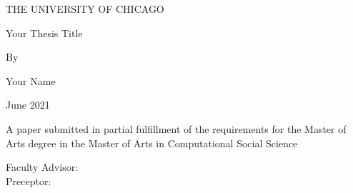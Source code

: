 \documentclass[letterpaper,12pt]{article}
\begin{document}
\begin{titlepage}

\begin{center}
\LARGE{THE UNIVERSITY OF CHICAGO}

\vspace{1in}

\LARGE{Your Thesis Title}

\vspace{1in}
    
\Large{By}

\vspace{0.5in}

\Large{Your Name}

\vspace{0.5in}

\Large{June 2021} %
    
\vfill
    
\Large{A paper submitted in partial fulfillment of the requirements for the Master of Arts degree in the Master of Arts in Computational Social Science}
    
\vspace{0.5in}
    
\begin{flushleft}
\Large{Faculty Advisor: } \\
\Large{Preceptor: }
\end{flushleft}
\end{center}

\end{titlepage}
\end{document}
